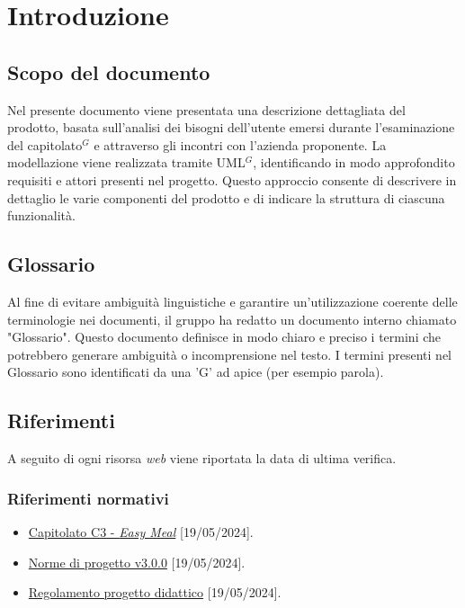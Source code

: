 \section{Introduzione}

\subsection{Scopo del documento}
Nel presente documento viene presentata una descrizione dettagliata del prodotto, basata sull'analisi dei bisogni dell'utente emersi durante l'esaminazione del capitolato$^G$ e attraverso gli incontri con l'azienda proponente. 
La modellazione viene realizzata tramite UML$^G$, identificando in modo approfondito requisiti e attori presenti nel progetto. 
Questo approccio consente di descrivere in dettaglio le varie componenti del prodotto e di indicare la struttura di ciascuna funzionalità.

\subsection{Glossario}
Al fine di evitare ambiguità linguistiche e garantire un'utilizzazione coerente delle terminologie nei documenti, il gruppo ha redatto un documento interno chiamato "Glossario". Questo
documento definisce in modo chiaro e preciso i termini che potrebbero generare ambiguità
o incomprensione nel testo. I termini presenti nel Glossario sono identificati da una 'G' ad
apice (per esempio parola\g).

\subsection{Riferimenti}
A seguito di ogni risorsa \textit{web} viene riportata la data di ultima verifica. 
\subsubsection{Riferimenti normativi}
\begin{itemize}
    \item \href{https://www.math.unipd.it/~tullio/IS-1/2023/Progetto/C3.pdf}{Capitolato C3 - \textit{Easy Meal}} [19/05/2024].
    \item \href{https://project-swenergy.github.io/}{Norme di progetto v3.0.0} [19/05/2024]. 
    \item \href{https://www.math.unipd.it/~tullio/IS-1/2023/Dispense/PD2.pdf}{Regolamento progetto didattico} [19/05/2024]. 
\end{itemize}

